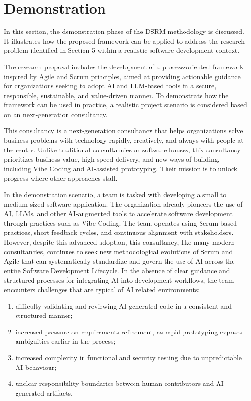 \section{Demonstration}
In this section, the demonstration phase of the DSRM methodology is discussed. It illustrates how the proposed framework can be applied to address the research problem identified in Section 5 within a realistic software development context.

The research proposal includes the development of a process-oriented framework inspired by Agile and Scrum principles, aimed at providing actionable guidance for organizations seeking to adopt AI and LLM-based tools in a secure, responsible, sustainable, and value-driven manner. To demonstrate how the framework can be used in practice, a realistic project scenario is considered based on an next-generation consultancy.

This consultancy is a next-generation consultancy that helps organizations solve business problems with technology rapidly, creatively, and always with people at the centre. Unlike traditional consultancies or software houses, this consultancy prioritizes business value, high-speed delivery, and new ways of building, including Vibe Coding and AI-assisted prototyping. Their mission is to unlock progress where other approaches stall.

In the demonstration scenario, a team is tasked with developing a small to medium-sized software application. The organization already pioneers the use of AI, LLMs, and other AI-augmented tools to accelerate software development through practices such as Vibe Coding. The team operates using Scrum-based practices, short feedback cycles, and continuous alignment with stakeholders. However, despite this advanced adoption, this consultancy, like many modern consultancies, continues to seek new methodological evolutions of Scrum and Agile that can systematically standardize and govern the use of AI across the entire Software Development Lifecycle. In the absence of clear guidance and structured processes for integrating AI into development workflows, the team encounters challenges that are typical of AI related environments:
\begin{enumerate}
    \item difficulty validating and reviewing AI-generated code in a consistent and structured manner;
    \item increased pressure on requirements refinement, as rapid prototyping exposes ambiguities earlier in the process;
    \item increased complexity in functional and security testing due to unpredictable AI behaviour;
    \item unclear responsibility boundaries between human contributors and AI-generated artifacts.
\end{enumerate}

